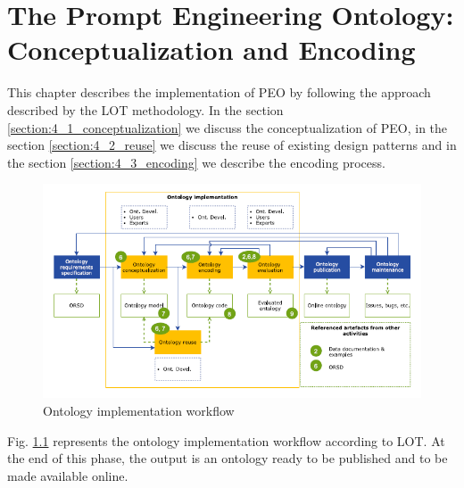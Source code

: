 \chapter{The Prompt Engineering Ontology: Conceptualization and Encoding}
\label{chapter:4_implementation}
This chapter describes the implementation of PEO by following the approach described by the LOT methodology. 
In the section \ref{section:4_1_conceptualization} we discuss the conceptualization of PEO, in the section \ref{section:4_2_reuse} we discuss the reuse of existing design patterns and in the section \ref{section:4_3_encoding} we describe the encoding process. 
\begin{figure}[H]
    \centering
    \includegraphics[width=0.9\linewidth]{Figures/fig_14.png}
    \caption{Ontology implementation workflow}
    \label{fig:14}
\end{figure}
Fig. \ref{fig:14} represents the ontology implementation workflow according to LOT.
At the end of this phase, the output is an ontology ready to be published and to be made available online.

